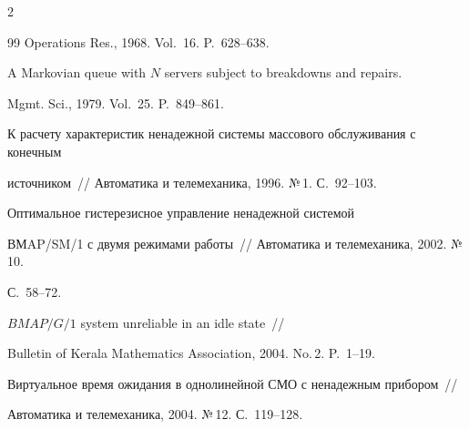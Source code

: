 \begin{multicols}{2}
{{\begin{thebibliography}{99}
Operations Res., 1968. Vol.~16. P.~628--638.









A Markovian queue with $N$ servers subject to breakdowns and repairs.


Mgmt. Sci., 1979. Vol.~25. P.~849--861.









К расчету характеристик ненадежной системы массового обслуживания с конечным


источником~// Автоматика и телемеханика, 1996. №\,1. С.~92--103.









Оптимальное гистерезисное управление ненадежной системой


ВМAP/SM/1 с двумя режимами работы~// Автоматика и телемеханика, 2002. №\,10.


С.~58--72.









$BMAP/G/1$ system unreliable in an idle state~//


Bulletin of Kerala Mathematics Association, 2004. No.\,2. P.~1--19.









Виртуальное время ожидания в однолинейной СМО с ненадежным прибором~//


Автоматика и телемеханика, 2004. №\,12. С.~119--128.










\end{thebibliography}}}
\end{multicols}
